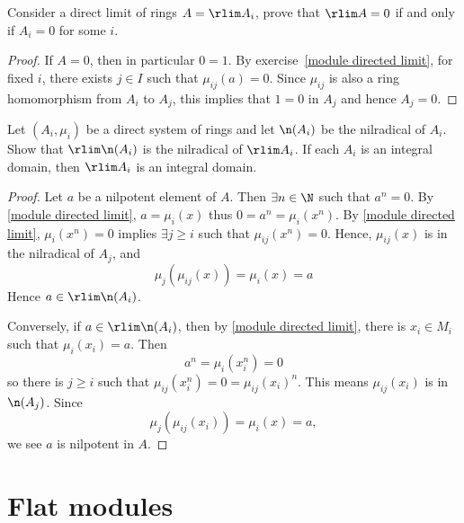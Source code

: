 \begin{exercise}\label{ring direct limit zero iff one zero}
Consider a direct limit of rings $A=\rlim A_i$, prove that $\rlim A=0$ if and only if $A_i=0$ for some $i$.
\end{exercise}
\begin{proof}
If $A=0$, then in particular $0=1$. By exercise~\ref{module directed limit}, for fixed $i$, there exists $j\in I$ such that $\mu_{ij}(a)=0$. Since $\mu_{ij}$ is also a ring homomorphism from $A_i$ to $A_j$, this implies that $1=0$ in $A_j$ and hence $A_j=0$.
\end{proof}
\begin{exercise}
Let $(A_i,\mu_i)$ be a direct system of rings and let $\n(A_i)$ be the nilradical of $A_i$. Show that $\rlim \n(A_i)$ is the nilradical of $\rlim A_i$. If each $A_i$ is an integral domain, then $\rlim A_i$ is an integral domain.
\end{exercise}
\begin{proof}
Let $a$ be a nilpotent element of $A$. Then $\exists n\in\N$ such that $a^n=0$. By \cref{module directed limit}, $a=\mu_i(x)$ thus $0=a^n=\mu_i(x^n)$. By \cref{module directed limit}, $\mu_i(x^n)=0$ implies $\exists j\geq i$ such that $\mu_{ij}(x^n)=0$. Hence, $\mu_{ij}(x)$ is in the nilradical of $A_j$, and
\[\mu_j(\mu_{ij}(x))=\mu_i(x)=a\]
Hence $a\in\rlim \n(A_i)$.\par
Conversely, if $a\in\rlim \n(A_i)$, then by \cref{module directed limit}, there is $x_i\in M_i$ such that $\mu_i(x_i)=a$. Then 
\[a^n=\mu_i(x_i^n)=0\]
so there is $j\geq i$ such that $\mu_{ij}(x_i^n)=0=\mu_{ij}(x_i)^n$. This means $\mu_{ij}(x_i)$ is in $\n(A_j)$. Since
\[\mu_j(\mu_{ij}(x_i))=\mu_i(x)=a,\]
we see $a$ is nilpotent in $A$.
\end{proof}
\section{Flat modules}
